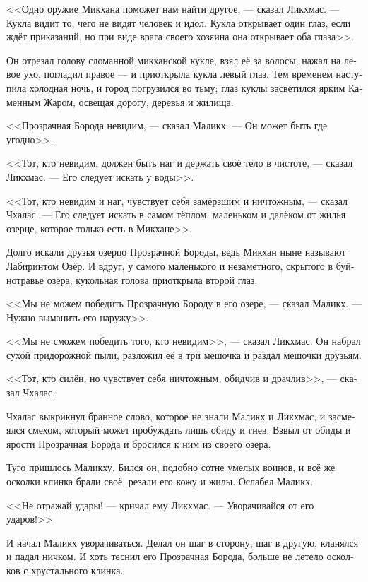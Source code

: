\documentclass[a4paper,12pt,fleqn]{book}\usepackage{polyglossia}\setdefaultlanguage[babelshorthands=true]{russian}\setotherlanguage{english}\defaultfontfeatures{Ligatures=TeX,Mapping=tex-text}\usepackage{xcolor}\newcommand{\ml}[3]{#2}
\newcommand{\textspace}{\vspace{1em}{\centering\Large\bfseries<...>\par}\vspace{1em}}
\begin{document}
{<<Одно оружие Микхана поможет нам найти другое, --- сказал Ликхмас.
--- Кукла видит то, чего не видят человек и идол.
Кукла открывает один глаз, если ждёт приказаний, но при виде врага своего хозяина она открывает оба глаза>>.

Он отрезал голову сломанной микханской кукле, взял её за волосы, нажал на левое ухо, погладил правое --- и приоткрыла кукла левый глаз.
Тем временем наступила холодная ночь, и город погрузился во тьму;
глаз куклы засветился ярким Каменным Жаром, освещая дорогу, деревья и жилища.

\textspace

<<Прозрачная Борода невидим, --- сказал Маликх.
--- Он может быть где угодно>>.

<<Тот, кто невидим, должен быть наг и держать своё тело в чистоте, --- сказал Ликхмас.
--- Его следует искать у воды>>.

<<Тот, кто невидим и наг, чувствует себя замёрзшим и ничтожным, --- сказал Чхалас.
--- Его следует искать в самом тёплом, маленьком и далёком от жилья озерце, которое только есть в Микхане>>.

Долго искали друзья озерцо Прозрачной Бороды, ведь Микхан ныне называют Лабиринтом Озёр.
И вдруг, у самого маленького и незаметного, скрытого в буйнотравье озера, кукольная голова приоткрыла второй глаз.

<<Мы не можем победить Прозрачную Бороду в его озере, --- сказал Маликх.
--- Нужно выманить его наружу>>.

<<Мы не сможем победить того, кто невидим>>, --- сказал Ликхмас.
Он набрал сухой придорожной пыли, разложил её в три мешочка и раздал мешочки друзьям.

<<Тот, кто силён, но чувствует себя ничтожным, обидчив и драчлив>>, --- сказал Чхалас.

Чхалас выкрикнул бранное слово, которое не знали Маликх и Ликхмас, и засмеялся смехом, который может пробуждать лишь обиду и гнев.
Взвыл от обиды и ярости Прозрачная Борода и бросился к ним из своего озера.

\textspace

Туго пришлось Маликху.
Бился он, подобно сотне умелых воинов, и всё же осколки клинка брали своё, резали его кожу и жилы.
Ослабел Маликх.

<<Не отражай удары! --- кричал ему Ликхмас.
--- Уворачивайся от его ударов!>>

И начал Маликх уворачиваться.
Делал он шаг в сторону, шаг в другую, кланялся и падал ничком.
И хоть теснил его Прозрачная Борода, больше не летело осколков с хрустального клинка.

}
\end{document}
